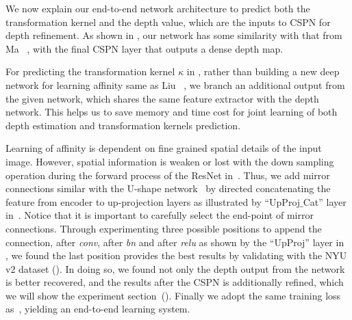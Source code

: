 We now explain our end-to-end network architecture to predict both the transformation kernel and the depth value, which are the inputs to CSPN for depth refinement.
 As shown in , our network has some similarity with that from Ma \etal~\cite{Ma2017SparseToDense}, with the final CSPN layer that outputs a dense depth map.  
 
For predicting the transformation kernel $\kappa$ in , 
rather than building a new deep network for learning affinity same as Liu \etal~\cite{liu2017learning}, we branch an additional output from the given network, which shares the same feature extractor with the depth network. This helps us to save memory and time cost for joint learning of both depth estimation and transformation kernels prediction. 

Learning of affinity is dependent on fine grained spatial details of the input image. However, spatial information is weaken or lost with the down sampling operation during the forward process of the ResNet in~\cite{laina2016deeper}. Thus, we add mirror connections similar with the U-shape network~\cite{ronneberger2015u} by directed concatenating the feature from encoder to up-projection layers as illustrated by ``UpProj$\_$Cat'' layer in~. Notice that it is important to carefully select the end-point of mirror connections. Through experimenting three possible positions to append the connection, \ie after \textit{conv}, after \textit{bn} and after \textit{relu} as shown by the ``UpProj'' layer in~ , we found the last position provides the best results by validating with the NYU v2 dataset (). 
In doing so, we found not only the depth output from the network is better recovered, and the results after the CSPN is additionally refined, which we will show the experiment section~().
Finally we adopt the same training loss as~\cite{Ma2017SparseToDense}, yielding an end-to-end learning system.

